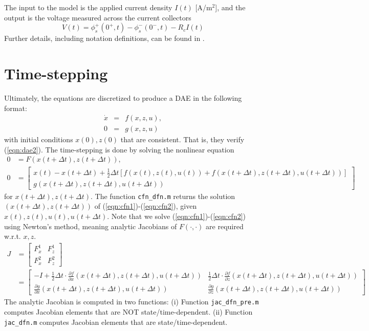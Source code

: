 \documentclass[12pt]{article}
\newcommand{\xdot}{\dot{x}}
\begin{document}
The input to the model is the applied current density  $I(t)$ [A/m$^{2}$], and the output is the voltage measured across the current collectors
\begin{equation}\label{eqn:voltage}
	V(t) = \phi^{+}_{s}(0^{+},t) - \phi_{s}^{-}(0^{-},t) - R_c I(t)
\end{equation}
Further details, including notation definitions, can be found in \cite{Thomas2002,Chaturvedi2010}.

\section{Time-stepping}\label{sec:time-step}

Ultimately, the equations are discretized to produce a DAE in the following format:
\begin{eqnarray}
	\xdot &=& f(x, z, u), \label{eqn:dae1} \\
	0 &=& g(x,z,u) \label{eqn:dae2}
\end{eqnarray}
with initial conditions $x(0), z(0)$ that are consistent. That is, they verify (\ref{eqn:dae2}). The time-stepping is done by solving the nonlinear equation
\begin{align}
	 0 &= F(x(t + \Delta t), z(t + \Delta t)), \label{eqn:cfn1} \\
0 &= \left[
\begin{array}{c}
  x(t) - x(t+\Delta t) + \frac{1}{2} \Delta t \left[ f(x(t), z(t), u(t)) + f(x(t+\Delta t), z(t+\Delta t), u(t+\Delta t)) \right] \\
  g\left(x(t+\Delta t), z(t+\Delta t), u(t + \Delta t) \right)
\end{array}
\right] \label{eqn:cfn2}
\end{align} 
for $x(t+\Delta t), z(t+\Delta t)$. The function \texttt{cfn\_dfn.m} returns the solution $\left(x(t+\Delta t), z(t+\Delta t)\right)$ of (\ref{eqn:cfn1})-(\ref{eqn:cfn2}), given $x(t), z(t), u(t), u(t+\Delta t)$. Note that we solve (\ref{eqn:cfn1})-(\ref{eqn:cfn2}) using Newton's method, meaning analytic Jacobians of $F(\cdot, \cdot)$ are required w.r.t. $x,z$.
\begin{align}
J &=
\left[
\begin{array}{cc}
 F^{1}_{x} & F^{1}_{z}  \\
 F^{2}_{x} & F^{2}_{z}
\end{array}
\right] \\
&= 
\left[
\begin{array}{cc}
 -I + \frac{1}{2} \Delta t \cdot \frac{\partial f}{\partial x}(x(t+\Delta t),z(t+\Delta t),u(t+\Delta t)) & \frac{1}{2} \Delta t \cdot \frac{\partial f}{\partial z}(x(t+\Delta t),z(t+\Delta t),u(t+\Delta t))  \\
 \frac{\partial g}{\partial x}(x(t+\Delta t),z(t+\Delta t),u(t+\Delta t)) & \frac{\partial g}{\partial z}(x(t+\Delta t),z(t+\Delta t),u(t+\Delta t))
\end{array}
\right]
\end{align}
The analytic Jacobian is computed in two functions: (i) Function \texttt{jac\_dfn\_pre.m} computes Jacobian elements that are NOT state/time-dependent. (ii) Function \texttt{jac\_dfn.m} computes Jacobian elements that are state/time-dependent.
\end{document}
